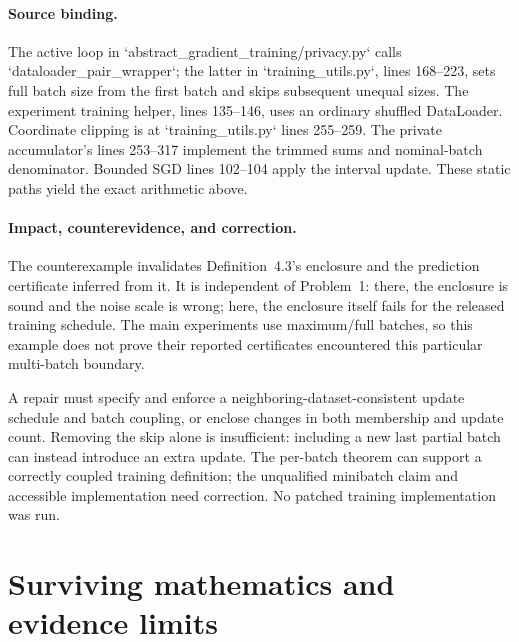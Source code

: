 \documentclass[10pt]{article}
\begin{document}
\paragraph*{Source binding.}\mbox{}\par
The active loop in `abstract\_gradient\_training/privacy.py` calls `dataloader\_pair\_wrapper`; the latter in `training\_utils.py`, lines 168–223, sets full batch size from the first batch and skips subsequent unequal sizes. The experiment training helper, lines 135–146, uses an ordinary shuffled DataLoader. Coordinate clipping is at `training\_utils.py` lines 255–259. The private accumulator’s lines 253–317 implement the trimmed sums and nominal-batch denominator. Bounded SGD lines 102–104 apply the interval update. These static paths yield the exact arithmetic above.\par
\paragraph*{Impact, counterevidence, and correction.}\mbox{}\par
The counterexample invalidates Definition 4.3’s enclosure and the prediction certificate inferred from it. It is independent of Problem 1: there, the enclosure is sound and the noise scale is wrong; here, the enclosure itself fails for the released training schedule. The main experiments use maximum/full batches, so this example does not prove their reported certificates encountered this particular multi-batch boundary.\par
A repair must specify and enforce a neighboring-dataset-consistent update schedule and batch coupling, or enclose changes in both membership and update count. Removing the skip alone is insufficient: including a new last partial batch can instead introduce an extra update. The per-batch theorem can support a correctly coupled training definition; the unqualified minibatch claim and accessible implementation need correction. No patched training implementation was run.\par
\section*{Surviving mathematics and evidence limits}
\end{document}
